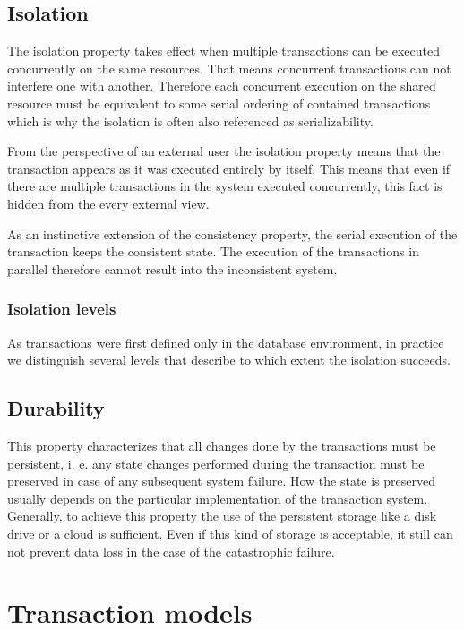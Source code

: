 \documentclass[oneside,
  digital, %
  table,   %
  nolof,     %
  nolot,     %
]{fithesis3}
\begin{document}
\subsection{Isolation}

The isolation property takes effect when multiple transactions can be executed concurrently on the same resources. That means concurrent transactions can not interfere one with another. Therefore each concurrent execution on the shared resource must be equivalent to some serial ordering of contained transactions which is why the isolation is often also referenced as serializability.

From the perspective of an external user the isolation property means that the transaction appears as it was executed entirely by itself. This means that even if there are multiple transactions in the system executed concurrently, this fact is hidden from the every external view.

As an instinctive extension of the consistency property, the serial execution of the transaction keeps the consistent state. The execution of the transactions in parallel therefore cannot result into the inconsistent system.

\subsubsection{Isolation levels}

As transactions were first defined only in the database environment, in practice we distinguish several levels that describe to which extent the isolation succeeds.


\subsection{Durability}

This property characterizes that all changes done by the transactions must be persistent, i. e. any state changes performed during the transaction must be preserved in case of any subsequent system failure. How the state is preserved usually depends on the particular implementation of the transaction system. Generally, to achieve this property the use of the persistent storage like a disk drive or a cloud is sufficient. Even if this kind of storage is acceptable, it still can not prevent data loss in the case of the catastrophic failure.



\section{Transaction models}
\end{document}
